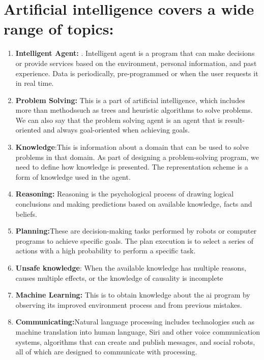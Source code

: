 \documentclass{article}
\begin{document}
\section{
Artificial intelligence covers a wide range of topics: }
\begin{enumerate}
	\item \textbf{Intelligent Agent: }. Intelligent agent is a program that can make decisions or provide services based on the environment, personal information, and past experience. Data is  periodically, pre-programmed or when the user requests it in real time. 

	\item \textbf{Problem Solving: } This is a part of artificial intelligence, which includes more than  methodssuch as trees and heuristic algorithms to solve problems. We can also say that the problem solving agent  is an agent that is result-oriented and always goal-oriented when achieving goals. 

	\item \textbf{Knowledge}:This is information about a domain that can be used to solve problems in that domain. As part of designing a problem-solving program, we need to define how knowledge is presented. The representation scheme is a form of knowledge used in the agent. 

	\item \textbf{Reasoning: }Reasoning is the psychological process of drawing logical conclusions and making predictions based on available  knowledge, facts and beliefs. 

	\item \textbf{Planning:}These are decision-making tasks performed by  robots or computer programs to achieve specific goals. The plan execution is to select a series of actions with a high probability to perform a specific task. 

	\item \textbf{Unsafe knowledge}: When the available knowledge has multiple reasons, causes multiple effects, or the knowledge of causality is incomplete 
	
	\item \textbf{Machine Learning: }This is to obtain knowledge about the ai program by observing its improved environment process and from previous mistakes.

	\item \textbf{Communicating:}Natural language processing includes technologies such as  machine translation into human language, Siri and other voice communication systems, algorithms that can create and publish messages, and social robots, all of which are designed to communicate with processing.


\end{enumerate}
\end{document}
